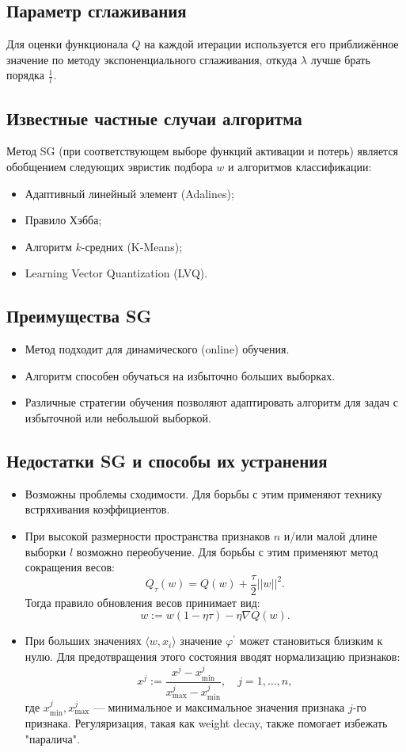 \subsection*{Параметр сглаживания}
Для оценки функционала \( Q \) на каждой итерации используется его приближённое значение по методу экспоненциального сглаживания, откуда \( \lambda \) лучше брать порядка \( \frac{1}{l} \).

\subsection*{Известные частные случаи алгоритма}
Метод SG (при соответствующем выборе функций активации и потерь) является обобщением следующих эвристик подбора \( w \) и алгоритмов классификации:
\begin{itemize}
    \item Адаптивный линейный элемент (Adalines);
    \item Правило Хэбба;
    \item Алгоритм \( k \)-средних (K-Means);
    \item Learning Vector Quantization (LVQ).
\end{itemize}

\subsection*{Преимущества SG}
\begin{itemize}
    \item Метод подходит для динамического (online) обучения.
    \item Алгоритм способен обучаться на избыточно больших выборках.
    \item Различные стратегии обучения позволяют адаптировать алгоритм для задач с избыточной или небольшой выборкой.
\end{itemize}

\subsection*{Недостатки SG и способы их устранения}
\begin{itemize}
    \item Возможны проблемы сходимости. Для борьбы с этим применяют технику встряхивания коэффициентов.
    \item При высокой размерности пространства признаков \( n \) и/или малой длине выборки \( l \) возможно переобучение. Для борьбы с этим применяют метод сокращения весов:
    $$ Q_{\tau}(w) = Q(w) + \frac{\tau}{2}||w||^2. $$
    Тогда правило обновления весов принимает вид:
    $$ w := w(1 - \eta \tau) - \eta \nabla Q(w). $$
    \item При больших значениях \( \langle w, x_i \rangle \) значение \( \varphi^\prime \) может становиться близким к нулю. Для предотвращения этого состояния вводят нормализацию признаков:
    $$ x^j := \frac{x^j - x_{\min}^j}{x_{\max}^j - x_{\min}^j}, \quad j = 1, \dots, n, $$
    где \( x_{\min}^j, x_{\max}^j \) — минимальное и максимальное значения признака \( j \)-го признака. Регуляризация, такая как weight decay, также помогает избежать "паралича".
\end{itemize}

